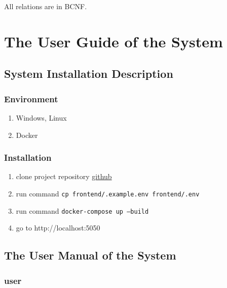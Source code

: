 \documentclass[a4paper, 12pt]{article}
\begin{document}
All relations are in BCNF.

\newpage

\section{The User Guide of the System}

\subsection{System Installation Description}

\subsubsection{Environment}
\begin{enumerate}
    \item Windows, Linux
    \item Docker
\end{enumerate}

\subsubsection{Installation}
\begin{enumerate}
    \item clone project repository \href{https://github.com/PUArallelepiped/PUN-street-Universal-Access}{github}
    \item run command \texttt{cp frontend/.example.env frontend/.env}
    \item run command \texttt{docker-compose up --build}
    \item go to http://localhost:5050
\end{enumerate}

\newpage

\subsection{The User Manual of the System}

\subsubsection{user}
\end{document}
